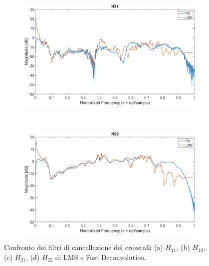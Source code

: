 \documentclass[12pt,a4paper,titlepage]{article}
\begin{document}
\begin{figure}[h]
	\ContinuedFloat
	\centering
	\begin{subfigure}{1\textwidth}
		\includegraphics[width=1\textwidth]{Immagini/H21_FD_LMS}
		\caption{}
		\label{fig:Confronto_H21_LMS_FD}
	\end{subfigure}\\
	\begin{subfigure}{1\textwidth}
		\includegraphics[width=1\textwidth]{Immagini/H22_FD_LMS}
		\caption{}
		\label{fig:Confronto_H22_LMS_FD}
	\end{subfigure}
	\caption{Confronto dei filtri di cancellazione del crosstalk (a) $H_{11}$, (b) $H_{12}$, (c) $H_{21}$, (d) $H_{22}$ di LMS e Fast Deconvolution.}
	\label{fig:confronto_H_LMS_FD}
\end{figure}
\end{document}
